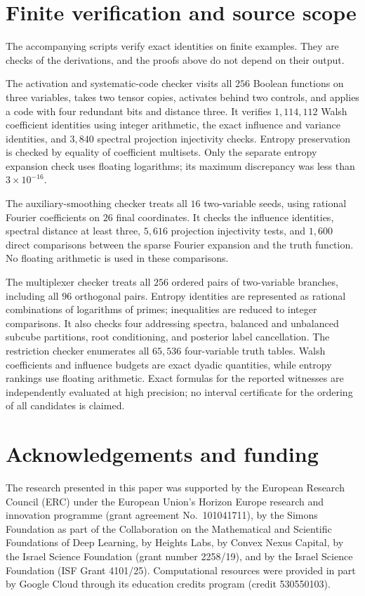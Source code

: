 \section{Finite verification and source scope}\label{sec:verification}

The accompanying scripts verify exact identities on finite examples. They are checks of the derivations, and the proofs above do not depend on their output.

The activation and systematic-code checker visits all $256$ Boolean functions on three variables, takes two tensor copies, activates behind two controls, and applies a code with four redundant bits and distance three. It verifies $1{,}114{,}112$ Walsh coefficient identities using integer arithmetic, the exact influence and variance identities, and $3{,}840$ spectral projection injectivity checks. Entropy preservation is checked by equality of coefficient multisets. Only the separate entropy expansion check uses floating logarithms; its maximum discrepancy was less than $3\times10^{-16}$.

The auxiliary-smoothing checker treats all $16$ two-variable seeds, using rational Fourier coefficients on $26$ final coordinates. It checks the influence identities, spectral distance at least three, $5{,}616$ projection injectivity tests, and $1{,}600$ direct comparisons between the sparse Fourier expansion and the truth function. No floating arithmetic is used in these comparisons.

The multiplexer checker treats all $256$ ordered pairs of two-variable branches, including all $96$ orthogonal pairs. Entropy identities are represented as rational combinations of logarithms of primes; inequalities are reduced to integer comparisons. It also checks four addressing spectra, balanced and unbalanced subcube partitions, root conditioning, and posterior label cancellation. The restriction checker enumerates all $65{,}536$ four-variable truth tables. Walsh coefficients and influence budgets are exact dyadic quantities, while entropy rankings use floating arithmetic. Exact formulas for the reported witnesses are independently evaluated at high precision; no interval certificate for the ordering of all candidates is claimed.

\section*{Acknowledgements and funding}
The research presented in this paper was supported by the European Research
Council (ERC) under the European Union's Horizon Europe research and
innovation programme (grant agreement No.~101041711), by the Simons
Foundation as part of the Collaboration on the Mathematical and Scientific
Foundations of Deep Learning, by Heights Labs, by Convex Nexus Capital, by
the Israel Science Foundation (grant number 2258/19), and by the Israel
Science Foundation (ISF Grant 4101/25). Computational resources were
provided in part by Google Cloud through its education credits program
(credit 530550103).

